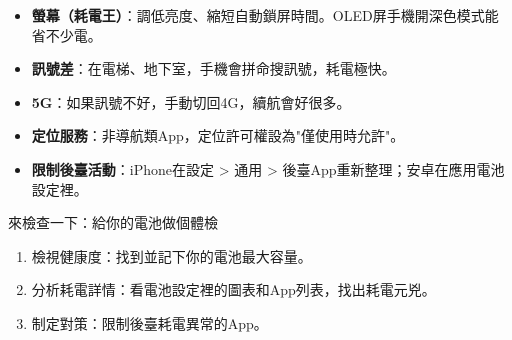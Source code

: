 
\begin{itemize}
  \item \textbf{螢幕（耗電王）}：調低亮度、縮短自動鎖屏時間。OLED屏手機開深色模式能省不少電。
  \item \textbf{訊號差}：在電梯、地下室，手機會拼命搜訊號，耗電極快。
  \item \textbf{5G}：如果訊號不好，手動切回4G，續航會好很多。
  \item \textbf{定位服務}：非導航類App，定位許可權設為"僅使用時允許"。
  \item \textbf{限制後臺活動}：iPhone在設定 > 通用 > 後臺App重新整理；安卓在應用電池設定裡。
\end{itemize}

\begin{tcbpractice}{來檢查一下：給你的電池做個體檢}
\begin{enumerate}
  \item 檢視健康度：找到並記下你的電池最大容量。
  \item 分析耗電詳情：看電池設定裡的圖表和App列表，找出耗電元兇。
  \item 制定對策：限制後臺耗電異常的App。
\end{enumerate}

\end{tcbpractice}
